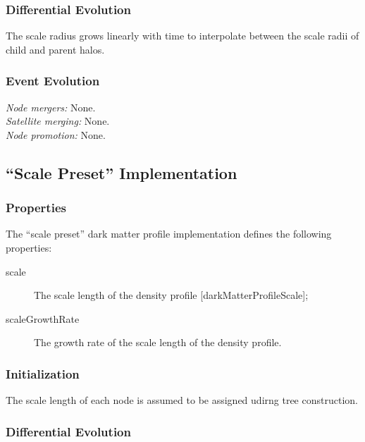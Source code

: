 \subsubsection{Differential Evolution}

The scale radius grows linearly with time to interpolate between the scale radii of child and parent halos.

\subsubsection{Event Evolution}

\noindent\emph{Node mergers:} None.\\

\noindent\emph{Satellite merging:} None.\\

\noindent\emph{Node promotion:} None.\\

\subsection{``Scale Preset'' Implementation}\label{sec:DarkMatterProfileScalePreset}

\subsubsection{Properties}

The ``scale preset'' dark matter profile implementation defines the following properties:
\begin{description}
 \item [{\normalfont \ttfamily scale}] The scale length of the density profile [{\normalfont \ttfamily darkMatterProfileScale}];
 \item [{\normalfont \ttfamily scaleGrowthRate}] The growth rate of the scale length of the density profile.
\end{description}

\subsubsection{Initialization}

The scale length of each node is assumed to be assigned udirng tree construction.

\subsubsection{Differential Evolution}

